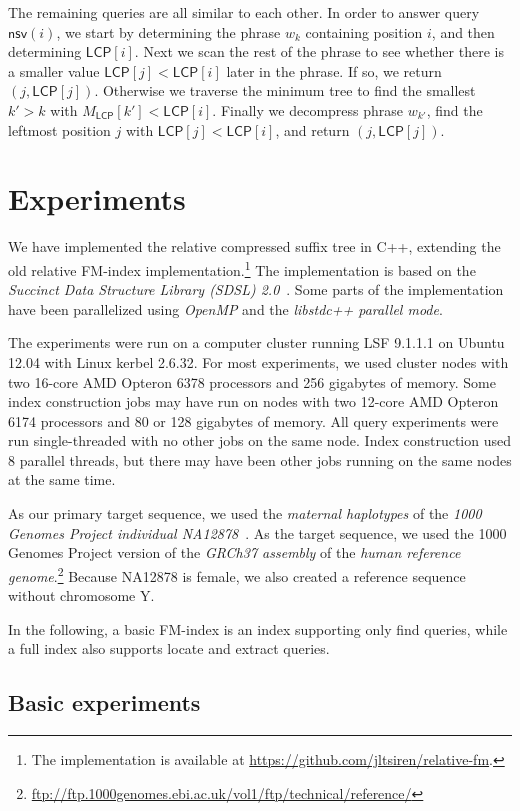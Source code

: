 \documentclass[a4paper,11pt]{llncs}
\newcommand{\mLCP}{\ensuremath{\mathsf{LCP}}}
\newcommand{\find}{\textsf{find}}
\newcommand{\locate}{\textsf{locate}}
\newcommand{\extract}{\textsf{extract}}
\newcommand{\mnsv}{\ensuremath{\mathsf{nsv}}}
\begin{document}
The remaining queries are all similar to each other. In order to answer query $\mnsv(i)$, we start by determining the phrase $w_{k}$ containing position $i$, and then determining $\mLCP[i]$. Next we scan the rest of the phrase to see whether there is a smaller value $\mLCP[j] < \mLCP[i]$ later in the phrase. If so, we return $(j,\mLCP[j])$. Otherwise we traverse the minimum tree to find the smallest $k' > k$ with $M_{\mLCP}[k'] < \mLCP[i]$. Finally we decompress phrase $w_{k'}$, find the leftmost position $j$ with $\mLCP[j] < \mLCP[i]$, and return $(j,\mLCP[j])$.


\section{Experiments}

We have implemented the relative compressed suffix tree in C++, extending the old relative FM-index implementation.\footnote{The implementation is available at \url{https://github.com/jltsiren/relative-fm}.} The implementation is based on the \emph{Succinct Data Structure Library (SDSL) 2.0}~\cite{Gog2014b}. Some parts of the implementation have been parallelized using \emph{OpenMP} and the \emph{libstdc++ parallel mode}.

The experiments were run on a computer cluster running LSF 9.1.1.1 on Ubuntu 12.04 with Linux kerbel 2.6.32. For most experiments, we used cluster nodes with two 16-core AMD Opteron 6378 processors and 256 gigabytes of memory. Some index construction jobs may have run on nodes with two 12-core AMD Opteron 6174 processors and 80 or 128 gigabytes of memory. All query experiments were run single-threaded with no other jobs on the same node. Index construction used 8 parallel threads, but there may have been other jobs running on the same nodes at the same time.

As our primary target sequence, we used the \emph{maternal haplotypes} of the \emph{1000 Genomes Project individual NA12878}~\cite{Rozowsky2011}. As the target sequence, we used the 1000 Genomes Project version of the \emph{GRCh37 assembly} of the \emph{human reference genome}.\footnote{\url{ftp://ftp.1000genomes.ebi.ac.uk/vol1/ftp/technical/reference/}} Because NA12878 is female, we also created a reference sequence without chromosome Y.

In the following, a basic FM-index is an index supporting only \find{} queries, while a full index also supports \locate{} and \extract{} queries.

\subsection{Basic experiments}
\end{document}
